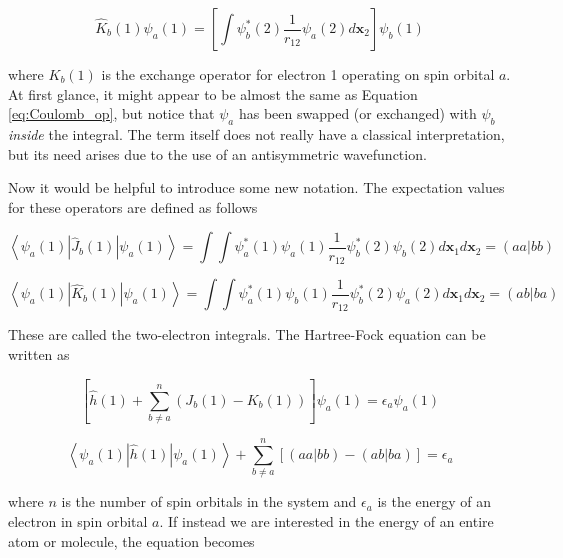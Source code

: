 \begin{equation}
\label{eq:exchange_op}
\hat{K}_{b}(1)\psi_{a}(1)=\left[\int\psi^{*}_{b}(2)\frac{1}{r_{12}}\psi_{a}(2)d\textbf{x}_{2}\right]\psi_{b}(1)
\end{equation} 

where $K_{b}(1)$ is the exchange operator for electron 1 operating on spin orbital $a$. At first glance, it might appear to be almost the same as Equation \ref{eq:Coulomb_op}, but notice that $\psi_{a}$ has been swapped (or exchanged) with $\psi_{b}$ \textit{inside} the integral. The term itself does not really have a classical interpretation, but its need arises due to the use of an antisymmetric wavefunction.

Now it would be helpful to introduce some new notation. The expectation values for these operators are defined as follows

\begin{equation}
\label{eq:Coulomb_op_ex}
\left<\psi_{a}(1)|\hat{J}_{b}(1)|\psi_{a}(1)\right>=\int\int\psi^{*}_{a}(1)\psi_{a}(1)\frac{1}{r_{12}}\psi^{*}_{b}(2)\psi_{b}(2)d\textbf{x}_{1}d\textbf{x}_{2}
=\left(aa|bb\right)
\end{equation} 

\begin{equation}
\label{eq:exchange_op_ex}
\left<\psi_{a}(1)|\hat{K}_{b}(1)|\psi_{a}(1)\right>=\int\int\psi^{*}_{a}(1)\psi_{b}(1)\frac{1}{r_{12}}\psi^{*}_{b}(2)\psi_{a}(2)d\textbf{x}_{1}d\textbf{x}_{2}
=\left(ab|ba\right)
\end{equation}

These are called the two-electron integrals. The Hartree-Fock equation can be written as 

 \begin{equation}
\label{eq:hartree-fock_eq}
\left[\hat{h}(1) + \sum^{n}_{b\neq a}\left(J_{b}(1)- K_{b}(1)\right)\right]\psi_{a}(1) = \epsilon_{a}\psi_{a}(1)
\end{equation}

 \begin{equation}
\label{eq:hartree-fock_eq}
\left<\psi_{a}(1)|\hat{h}(1)|\psi_{a}(1)\right> + \sum^{n}_{b\neq a}\left[\left(aa|bb\right) - \left(ab|ba\right)\right] = \epsilon_{a}
\end{equation}

where $n$ is the number of spin orbitals in the system and $\epsilon_{a}$ is the energy of an electron in spin orbital $a$. If instead we are interested in the energy of an entire atom or molecule, the equation becomes


